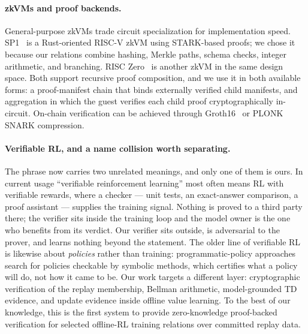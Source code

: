 \paragraph{zkVMs and proof backends.}
General-purpose zkVMs trade circuit specialization for implementation speed.
SP1~\cite{succinct2024sp1} is a Rust-oriented RISC-V zkVM using STARK-based
proofs; we chose it because our relations combine hashing, Merkle paths, schema
checks, integer arithmetic, and branching. RISC Zero~\cite{risczero2023} is
another zkVM in the same design space. Both support recursive proof
composition, and we use it in both available forms: a proof-manifest chain that
binds externally verified child manifests, and aggregation in which the guest
verifies each child proof cryptographically in-circuit. On-chain verification
can be achieved through
Groth16~\cite{groth2016zksnark} or PLONK~\cite{gabizon2019plonk} SNARK
compression.

\paragraph{Verifiable RL, and a name collision worth separating.}
The phrase now carries two unrelated meanings, and only one of them is ours.
In current usage ``verifiable reinforcement learning'' most often means RL with
verifiable rewards, where a checker --- unit tests, an exact-answer comparison,
a proof assistant --- supplies the training signal. Nothing is proved to a
third party there; the verifier sits inside the training loop and the model
owner is the one who benefits from its verdict. Our verifier sits outside, is
adversarial to the prover, and learns nothing beyond the statement. The older
line of verifiable RL is likewise about \emph{policies} rather than training:
programmatic-policy approaches~\cite{verma2019verifiable} search for policies
checkable by symbolic methods, which certifies what a policy will do, not how
it came to be. Our work targets a different layer:
cryptographic verification of the replay membership, Bellman arithmetic,
model-grounded TD evidence, and update evidence inside offline value learning.
To the best of our knowledge, this is the first system to provide
zero-knowledge proof-backed verification for selected offline-RL training
relations over committed replay data.

